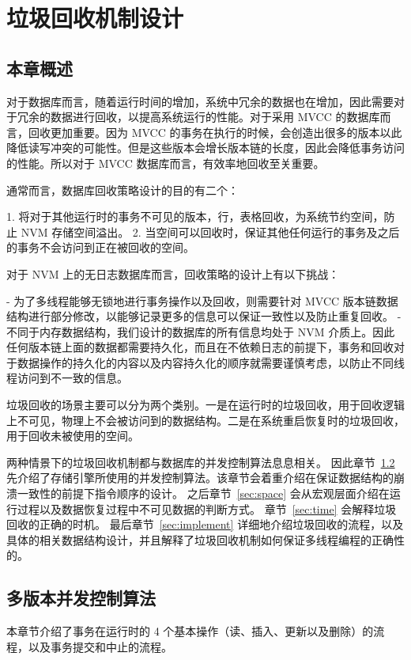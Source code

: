 
\chapter{垃圾回收机制设计}

\section{本章概述}

对于数据库而言，随着运行时间的增加，系统中冗余的数据也在增加，因此需要对于冗余的数据进行回收，以提高系统运行的性能。对于采用 MVCC 的数据库而言，回收更加重要。因为 MVCC 的事务在执行的时候，会创造出很多的版本以此降低读写冲突的可能性。但是这些版本会增长版本链的长度，因此会降低事务访问的性能。所以对于 MVCC 数据库而言，有效率地回收至关重要。

通常而言，数据库回收策略设计的目的有二个：

1. 将对于其他运行时的事务不可见的版本，行，表格回收，为系统节约空间，防止 NVM 存储空间溢出。
2. 当空间可以回收时，保证其他任何运行的事务及之后的事务不会访问到正在被回收的空间。

对于 NVM 上的无日志数据库而言，回收策略的设计上有以下挑战：

- 为了多线程能够无锁地进行事务操作以及回收，则需要针对 MVCC 版本链数据结构进行部分修改，以能够记录更多的信息可以保证一致性以及防止重复回收。
- 不同于内存数据结构，我们设计的数据库的所有信息均处于 NVM 介质上。因此任何版本链上面的数据都需要持久化，而且在不依赖日志的前提下，事务和回收对于数据操作的持久化的内容以及内容持久化的顺序就需要谨慎考虑，以防止不同线程访问到不一致的信息。



垃圾回收的场景主要可以分为两个类别。一是在运行时的垃圾回收，用于回收逻辑上不可见，物理上不会被访问到的数据结构。二是在系统重启恢复时的垃圾回收，用于回收未被使用的空间。

两种情景下的垃圾回收机制都与数据库的并发控制算法息息相关。
因此章节~\ref{sec:mvcc} 先介绍了存储引擎所使用的并发控制算法。该章节会着重介绍在保证数据结构的崩溃一致性的前提下指令顺序的设计。
之后章节~\ref{sec:space} 会从宏观层面介绍在运行过程以及数据恢复过程中不可见数据的判断方式。
章节~\ref{sec:time} 会解释垃圾回收的正确的时机。
最后章节~\ref{sec:implement} 详细地介绍垃圾回收的流程，以及具体的相关数据结构设计，并且解释了垃圾回收机制如何保证多线程编程的正确性的。

\section{多版本并发控制算法}
\label{sec:mvcc}
本章节介绍了事务在运行时的 4 个基本操作（读、插入、更新以及删除）的流程，以及事务提交和中止的流程。


